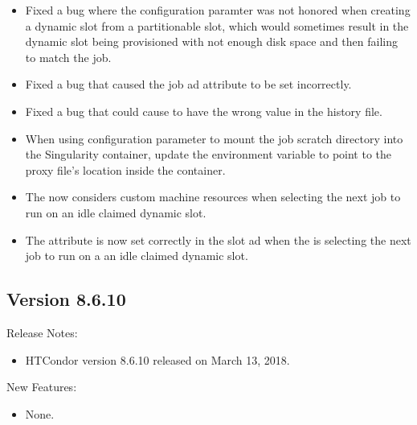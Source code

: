 \begin{itemize}
\item Fixed a bug where the configuration paramter  was
not honored when creating a dynamic slot from a partitionable slot, which would sometimes result
in the dynamic slot being provisioned with not enough disk space and then failing to match the job.

\item Fixed a bug that caused the job ad attribute
 to be set incorrectly.

\item Fixed a bug that could cause  to have
the wrong value in the history file.

\item When using configuration parameter 
to mount the job scratch directory into the Singularity container,
update the  environment variable to point to the
proxy file's location inside the container.

\item The  now considers custom machine resources when
selecting the next job to run on an idle claimed dynamic slot.

\item The attribute  is now set correctly in the slot
ad when the  is selecting the next job to run on a an
idle claimed dynamic slot.

\end{itemize}

\subsection*{\label{sec:New-8-6-10}Version 8.6.10}

\noindent Release Notes:

\begin{itemize}

\item HTCondor version 8.6.10 released on March 13, 2018.

\end{itemize}


\noindent New Features:

\begin{itemize}

\item None.

\end{itemize}

